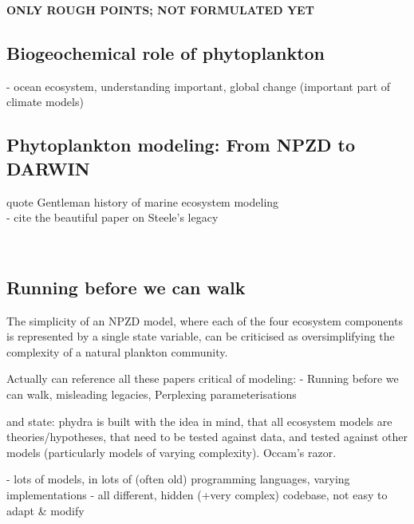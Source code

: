 \documentclass[template.tex]{subfiles}
\begin{document}
\introduction  %


\textbf{ONLY ROUGH POINTS; NOT FORMULATED YET}


\subsection{Biogeochemical role of phytoplankton}
- ocean ecosystem, understanding important, global change (important part of climate models)


\subsection{Phytoplankton modeling: From NPZD to DARWIN}
quote Gentleman history of marine ecosystem modeling
\\
- cite the beautiful paper on Steele's legacy
\citep{Anderson2019RememberingEcosystems}


\\


\subsection{Running before we can walk}
The simplicity of an NPZD model, where each of the four ecosystem components is represented by a single state variable, can be criticised as oversimplifying the complexity of a natural plankton community.

Actually can reference all these papers critical of modeling:
- Running before we can walk, misleading legacies, Perplexing parameterisations

and state: phydra is built with the idea in mind, that all ecosystem models are theories/hypotheses, that need to be tested against data, and tested against other models (particularly models of varying complexity). Occam's razor. 

- lots of models, in lots of (often old) programming languages, varying implementations
- all different, hidden (+very complex) codebase, not easy to adapt \& modify
\end{document}
